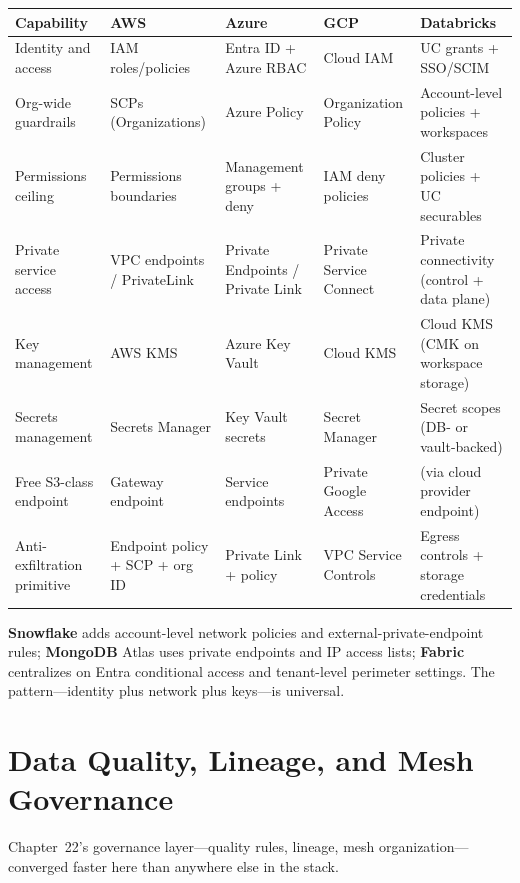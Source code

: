 \begin{center}
\footnotesize
\begin{tabular}{@{}p{2.4cm}p{2.9cm}p{2.9cm}p{2.9cm}p{2.9cm}@{}}
\toprule
\textbf{Capability} & \textbf{AWS} & \textbf{Azure} & \textbf{GCP} & \textbf{Databricks} \\
\midrule
Identity and access & IAM roles/policies & Entra ID + Azure RBAC & Cloud IAM & UC grants + SSO/SCIM \\
Org-wide guardrails & SCPs (Organizations) & Azure Policy & Organization Policy & Account-level policies + workspaces \\
Permissions ceiling & Permissions boundaries & Management groups + deny & IAM deny policies & Cluster policies + UC securables \\
Private service access & VPC endpoints / PrivateLink & Private Endpoints / Private Link & Private Service Connect & Private connectivity (control + data plane) \\
Key management & AWS KMS & Azure Key Vault & Cloud KMS & Cloud KMS (CMK on workspace storage) \\
Secrets management & Secrets Manager & Key Vault secrets & Secret Manager & Secret scopes (DB- or vault-backed) \\
\addlinespace
Free S3-class endpoint & Gateway endpoint & Service endpoints & Private Google Access & (via cloud provider endpoint) \\
Anti-exfiltration primitive & Endpoint policy + SCP + org ID & Private Link + policy & VPC Service Controls & Egress controls + storage credentials \\
\bottomrule
\end{tabular}
\end{center}

\noindent \textbf{Snowflake} adds account-level network policies and external-private-endpoint
rules; \textbf{MongoDB} Atlas uses private endpoints and IP access lists; \textbf{Fabric}
centralizes on Entra conditional access and tenant-level perimeter settings. The
pattern---identity plus network plus keys---is universal.

\section{Data Quality, Lineage, and Mesh Governance}
%
Chapter~22's governance layer---quality rules, lineage, mesh organization---converged faster here
than anywhere else in the stack.

